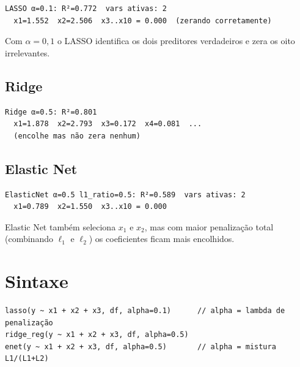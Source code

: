 \begin{lstlisting}[language={}, basicstyle=\ttfamily\small,
  frame=none, numbers=none, backgroundcolor=\color{codbg},
  xleftmargin=0pt, xrightmargin=0pt, breaklines=false]
LASSO α=0.1: R²=0.772  vars ativas: 2
  x1=1.552  x2=2.506  x3..x10 = 0.000  (zerando corretamente)
\end{lstlisting}

Com $\alpha = 0{,}1$ o LASSO identifica os dois preditores verdadeiros e
zera os oito irrelevantes.

\subsection*{Ridge}

\begin{lstlisting}[language={}, basicstyle=\ttfamily\small,
  frame=none, numbers=none, backgroundcolor=\color{codbg},
  xleftmargin=0pt, xrightmargin=0pt, breaklines=false]
Ridge α=0.5: R²=0.801
  x1=1.878  x2=2.793  x3=0.172  x4=0.081  ...
  (encolhe mas não zera nenhum)
\end{lstlisting}

\subsection*{Elastic Net}

\begin{lstlisting}[language={}, basicstyle=\ttfamily\small,
  frame=none, numbers=none, backgroundcolor=\color{codbg},
  xleftmargin=0pt, xrightmargin=0pt, breaklines=false]
ElasticNet α=0.5 l1_ratio=0.5: R²=0.589  vars ativas: 2
  x1=0.789  x2=1.550  x3..x10 = 0.000
\end{lstlisting}

Elastic Net também seleciona $x_1$ e $x_2$, mas com maior penalização total
(combinando $\ell_1$ e $\ell_2$) os coeficientes ficam mais encolhidos.

\section{Sintaxe}

\begin{lstlisting}
lasso(y ~ x1 + x2 + x3, df, alpha=0.1)      // alpha = lambda de penalização
ridge_reg(y ~ x1 + x2 + x3, df, alpha=0.5)
enet(y ~ x1 + x2 + x3, df, alpha=0.5)       // alpha = mistura L1/(L1+L2)
\end{lstlisting}

